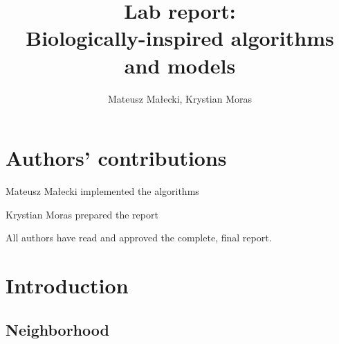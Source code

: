 \documentclass{article}
\title{Lab report:\\Biologically-inspired algorithms and models}
\author{Mateusz Małecki, Krystian Moras}
\begin{document}


\section*{Authors' contributions}

\begin{tightlist}
\item Mateusz Małecki implemented the algorithms
\item Krystian Moras prepared the report
\item All authors have read and approved the complete, final report.
\end{tightlist}




\section{Introduction}



\subsection{Neighborhood}
\end{document}
